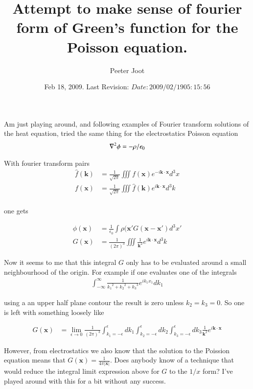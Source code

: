 \documentclass{article}
\title{ Attempt to make sense of fourier form of Green's function for the Poisson equation. }
\author{Peeter Joot}
\date{ Feb 18, 2009.  Last Revision: $Date: 2009/02/19 05:15:56 $ }
\begin{document}
\maketitle{}
\tableofcontents


Am just playing around, and 
following examples of Fourier transform solutions of the heat equation, tried the same thing for 
the electrostatics Poisson equation
\begin{align*}
\nabla^2 \phi &= -\rho/\epsilon_0 \\
\end{align*}

With fourier transform pairs
\begin{align*}
\hat{f}(\mathbf{k}) &= \frac{1}{\sqrt{2\pi}} \iiint f(\mathbf{x}) e^{-i \mathbf{k} \cdot \mathbf{x} } d^3 x \\
{f}(\mathbf{x}) &= \frac{1}{\sqrt{2\pi}} \iiint \hat{f}(\mathbf{k}) e^{i \mathbf{k} \cdot \mathbf{x} } d^3 k \\
\end{align*}

one gets 

\begin{align*}
\phi(\mathbf{x}) &= \frac{1}{\epsilon_0} \int \rho(\mathbf{x}' G(\mathbf{x-x'}) d^3 x' \\
G(\mathbf{x}) &= \frac{1}{(2 \pi)^3} \iiint \frac{1}{\mathbf{k}^2} e^{ i \mathbf{k} \cdot \mathbf{x} } d^3 k
\end{align*}

Now it seems to me that this integral $G$ only has to be evaluated around a small neighbourhood of the origin.  For example if one evaluates one of
the
integrals  
\begin{align*}
\int_{-\infty}^\infty \frac{1}{{k_1}^2 + {k_2}^2 + {k_3}^3 } e^{ i k_1 x_1 } dk_1 
\end{align*}

using a an upper half plane contour the result is zero unless $k_2 = k_3 = 0$.  So one is left with something loosely like

\begin{align*}
G(\mathbf{x}) &= \lim_{\epsilon \rightarrow 0} \frac{1}{(2 \pi)^3} 
\int_{k_1 = -\epsilon}^{\epsilon} dk_1
\int_{k_2 = -\epsilon}^{\epsilon} dk_2
\int_{k_3 = -\epsilon}^{\epsilon} dk_3
 \frac{1}{\mathbf{k}^2} e^{ i \mathbf{k} \cdot \mathbf{x} } 
\end{align*}

However, from electrostatics we also know that the solution to the Poission equation means that $G(\mathbf{x}) = \frac{1}{4\pi\lvert{\mathbf{x}}\rvert}$.
Does anybody know of a technique that would reduce the integral limit expression above for $G$ to the $1/x$ form?  I've played around with this for a bit
without any success.



\end{document}
